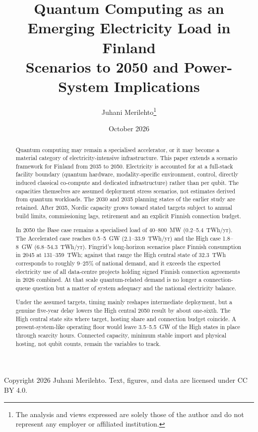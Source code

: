\documentclass[11pt,a4paper]{article}
\title{\textbf{Quantum Computing as an Emerging Electricity Load in Finland}\\[4pt]
\large Scenarios to 2050 and Power-System Implications}
\author{Juhani Merilehto\thanks{The analysis and views expressed are solely those of the author and do not represent any employer or affiliated institution.}}
\date{October 2026}
\begin{document}
\maketitle
\vspace{-1.2em}
\begin{center}\small\color{ink2}Copyright \textcopyright{} 2026 Juhani Merilehto. Text, figures, and data are licensed under CC BY 4.0.\end{center}

\begin{abstract}
\noindent Quantum computing may remain a specialised accelerator, or it may become a material category of electricity-intensive infrastructure. This paper extends a scenario framework for Finland from 2035 to 2050. Electricity is accounted for at a full-stack facility boundary (quantum hardware, modality-specific environment, control, directly induced classical co-compute and dedicated infrastructure) rather than per qubit. The capacities themselves are assumed deployment stress scenarios, not estimates derived from quantum workloads. The 2030 and 2035 planning states of the earlier study are retained. After 2035, Nordic capacity grows toward stated targets subject to annual build limits, commissioning lags, retirement and an explicit Finnish connection budget.

In 2050 the Base case remains a specialised load of 40--800~MW (0.2--5.4~TWh/yr). The Accelerated case reaches 0.5--5~GW (2.1--33.9~TWh/yr) and the High case 1.8--8~GW (6.8--54.3~TWh/yr). Fingrid's long-horizon scenarios place Finnish consumption in 2045 at 131--359~TWh; against that range the High central state of 32.3~TWh corresponds to roughly 9--25\% of national demand, and it exceeds the expected electricity use of all data-centre projects holding signed Finnish connection agreements in 2026 combined. At that scale quantum-related demand is no longer a connection-queue question but a matter of system adequacy and the national electricity balance.

Under the assumed targets, timing mainly reshapes intermediate deployment, but a genuine five-year delay lowers the High central 2050 result by about one-sixth. The High central state sits where target, hosting share and connection budget coincide. A present-system-like operating floor would leave 3.5--5.5~GW of the High states in place through scarcity hours. Connected capacity, minimum stable import and physical hosting, not qubit counts, remain the variables to track.
\end{abstract}
\end{document}

